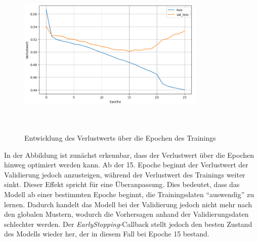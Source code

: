 \begin{figure}[h]
    \centering
    \includegraphics[width=0.8\textwidth,height=8cm,keepaspectratio=true]{content/images/TrainingLoss.png}
    \caption{Entwicklung des Verlustwerts über die Epochen des Trainings}
    \label{fig:TrainingLoss}
\end{figure}

In der Abbildung ist zunächst erkennbar, dass der Verlustwert über die Epochen hinweg optimiert werden kann.
Ab der 15. Epoche beginnt der Verlustwert der Validierung jedoch anzusteigen, während der Verlustwert des Trainings weiter sinkt.
Dieser Effekt spricht für eine Überanpassung.
Dies bedeutet, dass das Modell ab einer bestimmten Epoche beginnt, die Trainingsdaten "`auswendig"' zu lernen.
Dadurch handelt das Modell bei der Validierung jedoch nicht mehr nach den globalen Mustern, wodurch die Vorhersagen anhand der Validierungsdaten schlechter werden.
Der \emph{EarlyStopping}-Callback stellt jedoch den besten Zustand des Modells wieder her, der in diesem Fall bei Epoche 15 bestand.
